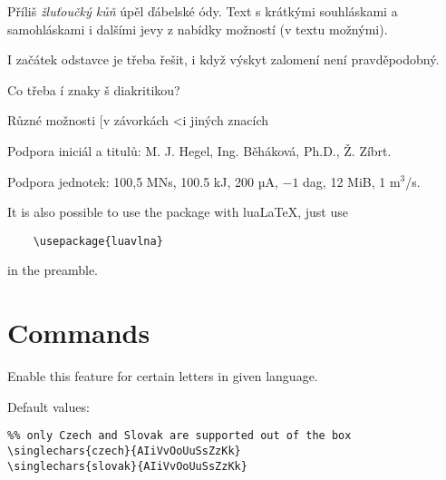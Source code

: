 \documentclass[12pt]{ltxdoc}
\newenvironment{mycode}{
	\medskip%
	\parindent=0pt%
}{\medskip}
\begin{document}

\noindent
\begin{minipage}{3in}
\preventsingledebugon
{}
Příliš \textit{žluťoučký kůň} úpěl ďábelské ódy. 
Text s krátkými souhláskami a samohláskami i dalšími jevy z nabídky možností (v textu možnými). 

I začátek odstavce je třeba řešit, i když výskyt zalomení není pravděpodobný.

Co třeba í znaky š diakritikou?

Různé možnosti [v závorkách \textless i jiných znacích

Podpora iniciál a titulů: M. J. Hegel, Ing. Běháková, Ph.D., Ž. Zíbrt.

Podpora jednotek: 100,5 MN\cdot{}s, 100.5 kJ, 200 µA, $-1$ dag, 12 MiB, 1 m$^3$/s.

\preventsingledebugoff
\end{minipage}

\bigskip
It is also possible to use the package with lua\LaTeX, just use

\begin{verbatim}
	\usepackage{luavlna}
\end{verbatim}

in the preamble.

\section{Commands}

\begin{mycode}
\cmd{\singlechars} 
\end{mycode}

Enable this feature for certain letters in given language. 

Default values:

\begin{mycode}
\begin{verbatim}
%% only Czech and Slovak are supported out of the box
\singlechars{czech}{AIiVvOoUuSsZzKk}
\singlechars{slovak}{AIiVvOoUuSsZzKk}
\end{verbatim}
\end{mycode}

\end{document}

